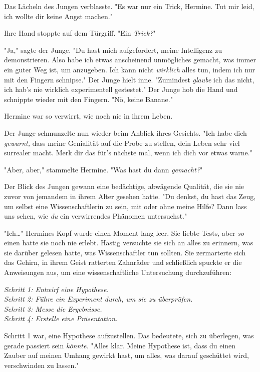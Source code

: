 {Das Lächeln des Jungen verblasste. "Es war nur ein Trick, Hermine. Tut mir leid, ich wollte dir keine Angst machen."

Ihre Hand stoppte auf dem Türgriff. "Ein \emph{Trick?}"

"Ja," sagte der Junge. "Du hast mich aufgefordert, meine Intelligenz zu demonstrieren. Also habe ich etwas anscheinend unmögliches gemacht, was immer ein guter Weg ist, um anzugeben. Ich kann nicht \emph{wirklich} alles tun, indem ich nur mit den Fingern schnipse." Der Junge hielt inne. "Zumindest \emph{glaube} ich das nicht, ich hab's nie wirklich experimentell gestestet." Der Junge hob die Hand und schnippte wieder mit den Fingern. "Nö, keine Banane."

Hermine war so verwirrt, wie noch nie in ihrem Leben.

Der Junge schmunzelte nun wieder beim Anblick ihres Gesichts. "Ich habe dich \emph{gewarnt,} dass meine Genialität auf die Probe zu stellen, dein Leben sehr viel surrealer macht. Merk dir das für's nächste mal, wenn ich dich vor etwas warne."

"Aber, aber," stammelte Hermine. "Was hast du dann \emph{gemacht?}"

Der Blick des Jungen gewann eine bedächtige, abwägende Qualität, die sie nie zuvor von jemandem in ihrem Alter gesehen hatte. "Du denkst, du hast das Zeug, um selbst eine Wissenschaftlerin zu sein, mit oder ohne meine Hilfe? Dann lass uns sehen, wie \emph{du} ein verwirrendes Phänomen untersuchst."

"Ich…" Hermines Kopf wurde einen Moment lang leer. Sie liebte Tests, aber \emph{so} einen hatte sie noch nie erlebt. Hastig versuchte sie sich an alles zu erinnern, was sie darüber gelesen hatte, was Wissenschaftler tun sollten. Sie zermarterte sich das Gehirn, in ihrem Geist ratterten Zahnräder und schließlich spuckte er die Anweisungen aus, um eine wissenschaftliche Untersuchung durchzuführen:

\emph{Schritt 1: Entwirf eine Hypothese.\\ Schritt 2: Führe ein Experiment durch, um sie zu überprüfen.\\ Schritt 3: Messe die Ergebnisse.\\ Schritt 4: Erstelle eine Präsentation.}

Schritt 1 war, eine Hypothese aufzustellen. Das bedeutete, sich zu überlegen, was gerade passiert sein \emph{könnte.} "Alles klar. Meine Hypothese ist, dass du einen Zauber auf meinen Umhang gewirkt hast, um alles, was darauf geschüttet wird, verschwinden zu lassen."

}
